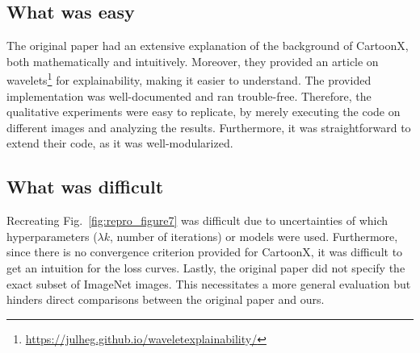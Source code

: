 
\subsection{What was easy}

The original paper had an extensive explanation of the background of CartoonX, both mathematically and intuitively. Moreover, they provided an article on wavelets\footnote{\url{https://julheg.github.io/waveletexplainability/}} for explainability, making it easier to understand. 
The provided implementation was well-documented and ran trouble-free. Therefore, the qualitative experiments were easy to replicate, by merely executing the code on different images and analyzing the results. Furthermore, it was straightforward to extend their code, as it was well-modularized.

\subsection{What was difficult}
Recreating Fig.~\ref{fig:repro_figure7} was difficult due to uncertainties of which hyperparameters ($\lambda k$, number of iterations) or models were used.
Furthermore, since there is no convergence criterion provided for CartoonX, it was difficult to get an intuition for the loss curves. 
Lastly, the original paper did not specify the exact subset of ImageNet images.
This necessitates a more general evaluation but hinders direct comparisons between the original paper and ours.


